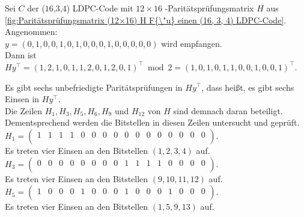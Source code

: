 \begin{Beispiel}
    Sei $C$ der (\(16\),\(3\),\(4\)) LDPC-Code mit $12 \times 16$ -Paritätsprüfungsmatrix $H$ aus 
    \autoref{fig:Paritätsprüfungsmatrix (12×16) H F{\"u} einen (16, 3, 4) LDPC-Code}.\\
    Angenommen:\\
    $y = (0,1,0,0,1,0,1,0,0,0,1,0,0,0,0,0)$ wird empfangen.\\
    
    Dann ist $Hy^\intercal = (1,2,1,0,1,1,2,0,1,2,0,1)^\intercal \bmod 2 = (1,0,1,0,1,1,0,0,1,0,0,1)^\intercal$.
    
    Es gibt sechs unbefriedigte Paritätsprüfungen in $Hy^\intercal$, dass hei\ss{}t, es gibt sechs Einsen in $Hy^\intercal.$\\
    Die Zeilen $H_1, H_3, H_5, H_6, H_9$ und $H_{12}$ von $H$ sind demnach daran beteiligt.\\ Dementsprechend werden die Bitstellen in diesen Zeilen untersucht und geprüft.\\
    
    $H_1= \left( \begin{array}{rrrrrrrrrrrrrrrr}
        1 & 1 & 1 & 1 & 0 & 0 & 0 & 0 & 0 & 0 & 0 & 0 & 0 & 0 & 0 & 0 \\
       \end{array}\right). 
    $\\
    Es treten vier Einsen an den Bitstellen $(1, 2, 3, 4)$ auf.\\
    
    $H_3= \left( \begin{array}{rrrrrrrrrrrrrrrr}
        0 & 0 & 0 & 0 & 0 & 0 & 0 & 0 & 1 & 1 & 1 & 1 & 0 & 0 & 0 & 0 \\
       \end{array}\right). 
    $\\
    Es treten vier Einsen an den Bitstellen $(9, 10, 11, 12)$ auf.\\
    
    $H_5= \left( \begin{array}{rrrrrrrrrrrrrrrr}
        1 & 0 & 0 & 0 & 1 & 0 & 0 & 0 & 1 & 0 & 0 & 0 & 1 & 0 & 0 & 0 \\
       \end{array}\right). 
    $\\
    Es treten vier Einsen an den Bitstellen $(1, 5, 9, 13)$ auf.\\
    

\end{Beispiel}
